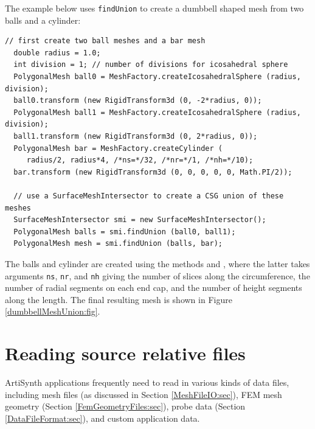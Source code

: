 The example below uses {\tt findUnion} to create a dumbbell shaped mesh
from two balls and a cylinder:
%
\begin{lstlisting}[]
  // first create two ball meshes and a bar mesh
  double radius = 1.0;
  int division = 1; // number of divisions for icosahedral sphere
  PolygonalMesh ball0 = MeshFactory.createIcosahedralSphere (radius, division);
  ball0.transform (new RigidTransform3d (0, -2*radius, 0));
  PolygonalMesh ball1 = MeshFactory.createIcosahedralSphere (radius, division);
  ball1.transform (new RigidTransform3d (0, 2*radius, 0));
  PolygonalMesh bar = MeshFactory.createCylinder (
     radius/2, radius*4, /*ns=*/32, /*nr=*/1, /*nh=*/10);
  bar.transform (new RigidTransform3d (0, 0, 0, 0, 0, Math.PI/2));

  // use a SurfaceMeshIntersector to create a CSG union of these meshes
  SurfaceMeshIntersector smi = new SurfaceMeshIntersector();
  PolygonalMesh balls = smi.findUnion (ball0, ball1);
  PolygonalMesh mesh = smi.findUnion (balls, bar);
\end{lstlisting}
%
The balls and cylinder are created using the
 methods
and
,
where the latter takes arguments {\tt ns}, {\tt nr}, and {\tt nh}
giving the number of slices along the circumference, the number of
radial segments on each end cap, and the number of height segments
along the length. The final resulting mesh is shown in Figure
\ref{dumbbellMeshUnion:fig}.

%

\section{Reading source relative files}
\label{PathFinder:sec}

ArtiSynth applications frequently need to read in various kinds of
data files, including mesh files (as discussed in Section
\ref{MeshFileIO:sec}), FEM mesh geometry (Section
\ref{FemGeometryFiles:sec}), probe data (Section
\ref{DataFileFormat:sec}), and custom application data.

